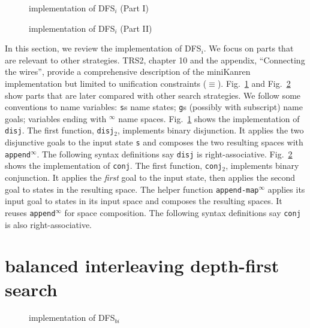 \documentclass[acmlarge]{acmart}
\newcommand{\conj}{\texttt{conj}}
\newcommand{\disj}{\texttt{disj}}
\newcommand{\disjtwo}{\texttt{disj$_2$}}
\newcommand{\conjtwo}{\texttt{conj$_2$}}
\newcommand{\appendInf}{\texttt{append$^\infty$}}
\newcommand{\appendMapInf}{\texttt{append-map$^\infty$}}
\newcommand{\DFSi }[0]{DFS$_{i}$}
\newcommand{\DFSbi}[0]{DFS$_{bi}$}
\begin{document}
\begin{figure}
	
	\caption{implementation of \DFSi{} (Part I)}
	\label{DFSi-0}
\end{figure}

\begin{figure}
	
	\caption{implementation of \DFSi{} (Part II)}
	\label{DFSi-1}
\end{figure}

In this section, we review the implementation of \DFSi{}. We focus on parts 
that are relevant to other strategies. TRS2,
chapter 10 and the appendix, ``Connecting the wires'', 
provide a comprehensive description of the miniKanren 
implementation but limited to unification constraints ($\equiv$).
Fig.~\ref{DFSi-0} and Fig.~\ref{DFSi-1} show parts that are later compared 
with other search strategies. We follow some conventions to name variables: 
\texttt{s}s name states; \texttt{g}s (possibly with subscript) name goals; 
variables ending with $^\infty$ name spaces. Fig.~\ref{DFSi-0} shows 
the 
implementation of \disj. The 
first function, \disjtwo, implements binary disjunction. It applies the 
two disjunctive goals to the input state \texttt{s} and composes the two 
resulting spaces with \appendInf{}. The following syntax 
definitions say \disj{} is right-associative. Fig.~\ref{DFSi-1} 
shows the implementation of \conj. The first function, \conjtwo{}, 
implements binary conjunction. 
It applies the \emph{first} goal to the input state, then applies the second 
goal to states in the resulting space. The helper function 
\appendMapInf{} applies its input goal to states 
in its input space and composes the resulting spaces. It reuses 
\appendInf{} for space composition. The following syntax 
definitions say \conj{} is also right-associative.

\section{balanced interleaving depth-first search}

\begin{figure}
	
	\caption{implementation of \DFSbi{}}
	\label{balanced-disj}
\end{figure}
\end{document}
